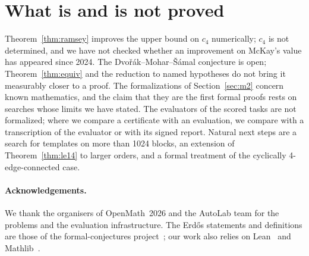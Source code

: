 \documentclass[11pt,a4paper]{article}
\theoremstyle{remark}
\begin{document}
\section{What is and is not proved}\label{sec:limits}

Theorem~\ref{thm:ramsey} improves the upper bound on $c_4$ numerically; $c_4$ is not determined, and we have not
checked whether an improvement on McKay's value has appeared since 2024. The Dvo\v{r}\'ak--Mohar--\v{S}\'amal
conjecture is open; Theorem~\ref{thm:equiv} and the reduction to named hypotheses do not bring it measurably closer
to a proof. The formalizations of Section~\ref{sec:m2} concern known mathematics, and the claim that they are the
first formal proofs rests on searches whose limits we have stated. The evaluators of the scored tasks are not
formalized; where we compare a certificate with an evaluation, we compare with a transcription of the evaluator or
with its signed report. Natural next steps are a search for templates on more than 1024 blocks, an extension of
Theorem~\ref{thm:le14} to larger orders, and a formal treatment of the cyclically 4-edge-connected case.

\paragraph{Acknowledgements.}
We thank the organisers of OpenMath~2026 and the AutoLab team for the problems and the evaluation infrastructure. The
Erd\H{o}s statements and definitions are those of the formal-conjectures project~\cite{fc}; our work also relies on
Lean~\cite{lean4} and Mathlib~\cite{mathlib}.
\end{document}
